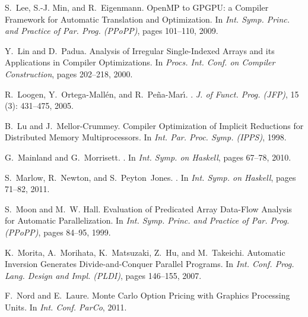 \documentclass{sigplanconf}  %
\begin{document}
\begin{thebibliography}{49}
S.~Lee, S.-J. Min, and R.~Eigenmann.
\newblock Open{MP} to {GPGPU}: a {C}ompiler {F}ramework for {A}utomatic
  {T}ranslation and {O}ptimization.
\newblock In \emph{Int. Symp. Princ. and Practice of Par. Prog. (PPoPP)}, pages
  101--110, 2009.

Y.~Lin and D.~Padua.
\newblock Analysis of {I}rregular {S}ingle-{I}ndexed {A}rrays and its
  {A}pplications in {C}ompiler {O}ptimizations.
\newblock In \emph{Procs. Int. Conf. on Compiler Construction}, pages 202--218,
  2000.

R.~Loogen, Y.~Ortega-Mall\'{e}n, and R.~{Pe\~{n}a-Mar\'{\i}}.
.
\newblock \emph{J. of Funct. Prog. (JFP)}, 15 (3): 431--475,
  2005.

B.~Lu and J.~Mellor-Crummey.
\newblock Compiler {O}ptimization of {I}mplicit {R}eductions for {D}istributed
  {M}emory {M}ultiprocessors.
\newblock In \emph{Int. Par. Proc. Symp. (IPPS)}, 1998.

G.~Mainland and G.~Morrisett.
.
\newblock In \emph{Int. Symp. on Haskell}, pages 67--78, 2010.

S.~Marlow, R.~Newton, and S.~Peyton~Jones.
.
\newblock In \emph{Int. Symp. on Haskell}, pages 71--82, 2011.

S.~Moon and M.~W. Hall.
\newblock Evaluation of {P}redicated {A}rray {D}ata-{F}low {A}nalysis for
  {A}utomatic {P}arallelization.
\newblock In \emph{Int. Symp. Princ. and Practice of Par. Prog. (PPoPP)}, pages
  84--95, 1999.

K.~Morita, A.~Morihata, K.~Matsuzaki, Z.~Hu, and M.~Takeichi.
\newblock Automatic {I}nversion {G}enerates {D}ivide-and-{C}onquer {P}arallel
  {P}rograms.
\newblock In \emph{Int. Conf. Prog. Lang. Design and Impl. (PLDI)}, pages
  146--155, 2007.

F.~Nord and E.~Laure.
\newblock Monte {C}arlo {O}ption {P}ricing with {G}raphics {P}rocessing
  {U}nits.
\newblock In \emph{Int. Conf. ParCo}, 2011.


\end{thebibliography}
\end{document}
